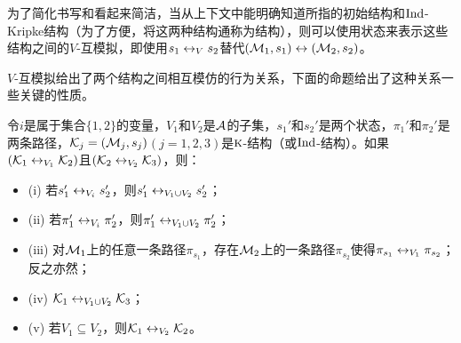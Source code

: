  为了简化书写和看起来简洁，当从上下文中能明确知道所指的初始结构和$\textrm{Ind}$-Kripke结构（为了方便，将这两种结构通称为结构），则可以使用状态来表示这些结构之间的$V$-互模拟，即使用$s_1 \leftrightarrow_V s_2$替代$({\cal M}_1, s_1)\leftrightarrow ({\cal M}_2,s_2)$。
 
 $V$-互模拟给出了两个结构之间相互模仿的行为关系，下面的命题给出了这种关系一些关键的性质。
 \begin{proposition}\label{pro:div}
 	令$i$是属于集合$\{1,2\}$的变量，$V_1$和$V_2$是${\cal A}$的子集，$s_1'$和$s_2'$是两个状态，$\pi_1'$和$\pi_2'$是两条路径，${\cal K}_j=({\cal M}_j,s_j)$$(j=1,2,3)$是$\textsc{k}$-结构（或$\textrm{Ind}$-结构）。如果$({\cal K}_1 \leftrightarrow_{V_1} {\cal K}_2)$且$({\cal K}_2 \leftrightarrow_{V_2} {\cal K}_3)$，则：
 	\begin{itemize}
 		\item[] (i) 若$s_1' \leftrightarrow_{V_i} s_2'$，则$s_1'\leftrightarrow_{V_1 \cup V_2} s_2'$；
 		\item[] (ii) 若$\pi_1' \leftrightarrow_{V_i} \pi_2'$，则$\pi_1'\leftrightarrow_{V_1 \cup V_2} \pi_2'$；
 		\item[] (iii) 对${\cal M}_1$上的任意一条路径$\pi_{s_1}$，存在${\cal M}_2$上的一条路径$\pi_{s_2}$使得$\pi_{s_1} \leftrightarrow_{V_1} \pi_{s_2}$；反之亦然；
 		\item[] (iv) ${\cal K}_1 \leftrightarrow_{V_1 \cup V_2} {\cal K}_3$；
 		\item[] (v) 若$V_1 \subseteq V_2$，则${\cal K}_1 \leftrightarrow_{V_2} {\cal K}_2$。
 	\end{itemize}
 \end{proposition}
